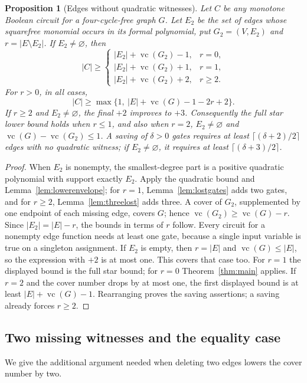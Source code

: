 \documentclass[11pt]{article}
\newcommand{\vc}{\operatorname{vc}}
\newtheorem{proposition}[theorem]{Proposition}
\theoremstyle{definition}
\theoremstyle{remark}
\begin{document}
\begin{proposition}[Edges without quadratic witnesses]\label{prop:missing}
Let $C$ be any monotone Boolean circuit for a four-cycle-free graph $G$. Let $E_2$ be the set of edges whose squarefree monomial occurs in its formal polynomial, put $G_2=(V,E_2)$ and $r=|E\setminus E_2|$. If $E_2\ne\varnothing$, then
\[
 |C|\ge
 \begin{cases}
 |E_2|+\vc(G_2)-1,&r=0,\\
 |E_2|+\vc(G_2)+1,&r=1,\\
 |E_2|+\vc(G_2)+2,&r\ge2.
 \end{cases}
\]
For $r>0$, in all cases,
\[
 |C|\ge\max\{1,\ |E|+\vc(G)-1-2r+2\}.
\]
If $r\ge2$ and $E_2\ne\varnothing$, the final $+2$ improves to $+3$. Consequently the full star lower bound holds when $r\le1$, and also when $r=2$, $E_2\ne\varnothing$ and $\vc(G)-\vc(G_2)\le1$. A saving of $\delta>0$ gates requires at least $\lceil(\delta+2)/2\rceil$ edges with no quadratic witness; if $E_2\ne\varnothing$, it requires at least $\lceil(\delta+3)/2\rceil$.
\end{proposition}
\begin{proof}
When $E_2$ is nonempty, the smallest-degree part is a positive quadratic polynomial with support exactly $E_2$. Apply the quadratic bound and Lemma~\ref{lem:lowerenvelope}; for $r=1$, Lemma~\ref{lem:lostgates} adds two gates, and for $r\ge2$, Lemma~\ref{lem:threelost} adds three. A cover of $G_2$, supplemented by one endpoint of each missing edge, covers $G$; hence $\vc(G_2)\ge\vc(G)-r$. Since $|E_2|=|E|-r$, the bounds in terms of $r$ follow. Every circuit for a nonempty edge function needs at least one gate, because a single input variable is true on a singleton assignment. If $E_2$ is empty, then $r=|E|$ and $\vc(G)\le|E|$, so the expression with $+2$ is at most one. This covers that case too. For $r=1$ the displayed bound is the full star bound; for $r=0$ Theorem~\ref{thm:main} applies. If $r=2$ and the cover number drops by at most one, the first displayed bound is at least $|E|+\vc(G)-1$. Rearranging proves the saving assertions; a saving already forces $r\ge2$.
\end{proof}

\subsection{Two missing witnesses and the equality case}
We give the additional argument needed when deleting two edges lowers the cover number by two.
\end{document}
